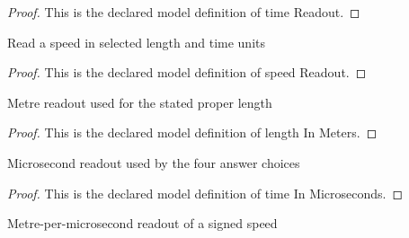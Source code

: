 \begin{proof}
  This is the declared model definition of time Readout.
\end{proof}
\begin{definition}
  \label{def:physics:phyx-mini-0568:phyxminiproblems-problemphyxmini0568-speedreadout}
  Read a speed in selected length and time units
\end{definition}
\begin{proof}
  This is the declared model definition of speed Readout.
\end{proof}
\begin{definition}
  \label{def:physics:phyx-mini-0568:phyxminiproblems-problemphyxmini0568-lengthinmeters}
  Metre readout used for the stated proper length
\end{definition}
\begin{proof}
  This is the declared model definition of length In Meters.
\end{proof}
\begin{definition}
  \label{def:physics:phyx-mini-0568:phyxminiproblems-problemphyxmini0568-timeinmicroseconds}
  Microsecond readout used by the four answer choices
\end{definition}
\begin{proof}
  This is the declared model definition of time In Microseconds.
\end{proof}
\begin{definition}
  \label{def:physics:phyx-mini-0568:phyxminiproblems-problemphyxmini0568-speedinmeterspermicrosecond}
  Metre-per-microsecond readout of a signed speed
\end{definition}
